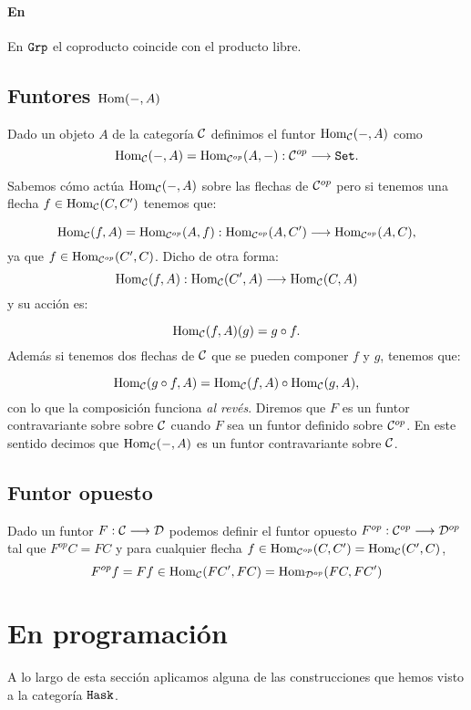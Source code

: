 \paragraph{En \Grp}
En $\texttt{Grp} $ el coproducto coincide con el producto libre.

\subsection{Funtores $\operatorname{Hom}(-, A)$}
Dado un objeto $A$ de la categoría $\mathcal{C}$ definimos el funtor
$\operatorname{Hom}_{\mathcal{C}}(-, A)$ como
$$\operatorname{Hom}_{\mathcal{C}}(-, A) = \operatorname{Hom}_{\mathcal{C}^{op}}(A, -) : \mathcal{C}^{op}\longrightarrow \texttt{Set}.$$

Sabemos cómo actúa $\operatorname{Hom}_{\mathcal{C}}(-, A)$ sobre las flechas de $\mathcal{C}^{op}$
pero si tenemos una flecha $f \in \operatorname{Hom}_{\mathcal{C}}(C, C')$ tenemos que:

$$\operatorname{Hom}_{\mathcal{C}}(f, A) = \operatorname{Hom}_{\mathcal{C}^{op}}(A, f) :
  \operatorname{Hom}_{\mathcal{C}^{op}}(A, C')\longrightarrow \operatorname{Hom}_{\mathcal{C}^{op}}(A, C),$$
ya que $f \in \operatorname{Hom}_{\mathcal{C}^{op}}(C', C)$. Dicho de otra forma:
$$\operatorname{Hom}_{\mathcal{C}}(f, A) : \operatorname{Hom}_{\mathcal{C}}(C', A)\longrightarrow \operatorname{Hom}_{\mathcal{C}}(C, A)$$
y su acción es:

$$\operatorname{Hom}_{\mathcal{C}}(f, A)(g) = g\circ f.$$
Además si tenemos dos flechas de $\mathcal{C}$ que se pueden componer
$f$ y $g$, tenemos que:

$$\operatorname{Hom}_{\mathcal{C}}(g \circ f, A) = \operatorname{Hom}_{\mathcal{C}}(f, A) \circ \operatorname{Hom}_{\mathcal{C}}(g, A),$$
con lo que la composición funciona \textit{al revés}. Diremos que
$F$ es un funtor contravariante sobre sobre $\mathcal{C}$ cuando $F$ sea
un funtor definido sobre $\mathcal{C}^{op}$. En este sentido
decimos que $\operatorname{Hom}_{\mathcal{C}}(-, A)$ es un funtor contravariante
sobre $\mathcal{C}$.

\subsection{Funtor opuesto}
Dado un funtor $F : \mathcal{C}\longrightarrow \mathcal{D}$ podemos definir el funtor opuesto
$F^{op} : \mathcal{C}^{op}\longrightarrow \mathcal{D}^{op}$ tal que $F^{op}C = FC$ y para cualquier
flecha $f \in \operatorname{Hom}_{\mathcal{C}^{op}}(C, C') = \operatorname{Hom}_{\mathcal{C}}(C', C)$,
$$F^{op}f = F f \in \operatorname{Hom}_{\mathcal{C}}(FC', FC) = \operatorname{Hom}_{\mathcal{D}^{op}}(FC, FC')$$

\section{En programación}
A lo largo de esta sección aplicamos alguna de
las construcciones que hemos visto
a la categoría $\texttt{Hask}$.

